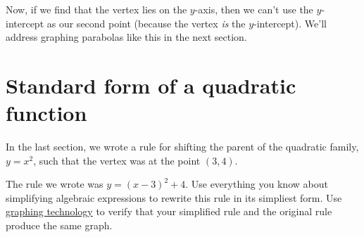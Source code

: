 \begin{figure}
\end{figure}

Now, if we find that the vertex lies on the $y$-axis, then we can't use the $y$-intercept as our second point (because the vertex \textit{is} the $y$-intercept). We'll address graphing parabolas like this in the next section.


\section{Standard form of a quadratic function}
\label{sec:standardformquad}

\begin{boxexplore}
In the last section, we wrote a rule for shifting the parent of the quadratic family, $y=x^2$, such that the vertex was at the point $(3, 4)$.

\begin{center}
\end{center}

The rule we wrote was $y=(x-3)^2 + 4$. Use everything you know about simplifying algebraic expressions to rewrite this rule in its simpliest form. Use \href{https://www.desmos.com/}{graphing technology} to verify that your simplified rule and the original rule produce the same graph.
\end{boxexplore}

